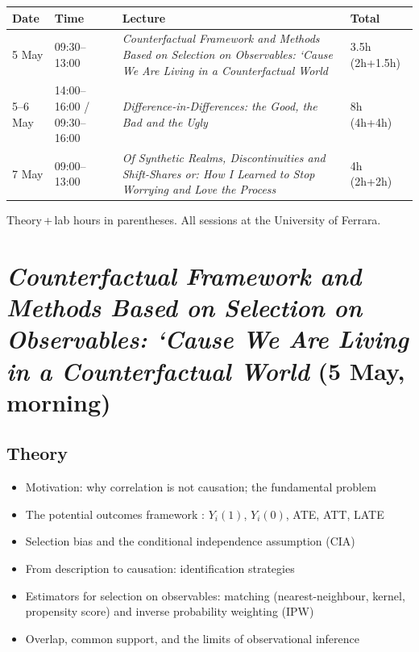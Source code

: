 \documentclass[11pt, a4paper]{article}
\begin{document}
\begin{center}
\renewcommand{\arraystretch}{1.4}
\begin{tabularx}{\textwidth}{@{}lp{3.4cm}Xp{2.6cm}@{}}
\toprule
\textbf{Date} & \textbf{Time} & \textbf{Lecture} & \textbf{Total}\\
\midrule
5 May & 09:30--13:00
  & \textit{Counterfactual Framework and Methods Based on Selection on Observables: `Cause We Are Living in a Counterfactual World}
  & 3.5h (2h+1.5h) \\
5--6 May & 14:00--16:00 / 09:30--16:00
  & \textit{Difference-in-Differences: the Good, the Bad and the Ugly}
  & 8h (4h+4h) \\
7 May & 09:00--13:00
  & \textit{Of Synthetic Realms, Discontinuities and Shift-Shares or: How I Learned to Stop Worrying and Love the Process}
  & 4h (2h+2h) \\
\bottomrule
\end{tabularx}
\end{center}
{\small Theory\,+\,lab hours in parentheses. All sessions at the University of Ferrara.}

\section{\textit{Counterfactual Framework and Methods Based on Selection on Observables: `Cause We Are Living in a Counterfactual World} (5 May, morning)}

\subsection*{Theory}

\begin{itemize}[leftmargin=1.4em, itemsep=2pt]
  \item Motivation: why correlation is not causation; the fundamental problem
  \item The potential outcomes framework \citep{rubin1980}:
        $Y_i(1)$, $Y_i(0)$, ATE, ATT, LATE
  \item Selection bias and the conditional independence assumption (CIA)
  \item From description to causation: identification strategies
  \item Estimators for selection on observables: matching (nearest-neighbour,
        kernel, propensity score) and inverse probability weighting (IPW)
  \item Overlap, common support, and the limits of observational inference
\end{itemize}
\end{document}
